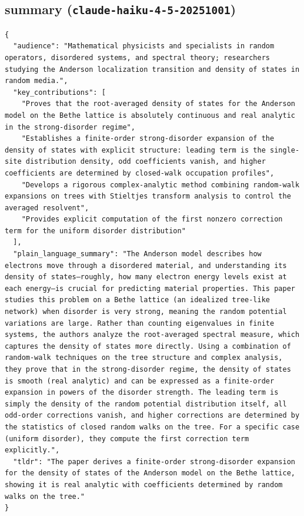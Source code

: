 \documentclass[11pt]{article}
\begin{document}
\subsection*{summary (\texttt{claude-haiku-4-5-20251001})}
\begin{verbatim}
{
  "audience": "Mathematical physicists and specialists in random operators, disordered systems, and spectral theory; researchers studying the Anderson localization transition and density of states in random media.",
  "key_contributions": [
    "Proves that the root-averaged density of states for the Anderson model on the Bethe lattice is absolutely continuous and real analytic in the strong-disorder regime",
    "Establishes a finite-order strong-disorder expansion of the density of states with explicit structure: leading term is the single-site distribution density, odd coefficients vanish, and higher coefficients are determined by closed-walk occupation profiles",
    "Develops a rigorous complex-analytic method combining random-walk expansions on trees with Stieltjes transform analysis to control the averaged resolvent",
    "Provides explicit computation of the first nonzero correction term for the uniform disorder distribution"
  ],
  "plain_language_summary": "The Anderson model describes how electrons move through a disordered material, and understanding its density of states—roughly, how many electron energy levels exist at each energy—is crucial for predicting material properties. This paper studies this problem on a Bethe lattice (an idealized tree-like network) when disorder is very strong, meaning the random potential variations are large. Rather than counting eigenvalues in finite systems, the authors analyze the root-averaged spectral measure, which captures the density of states more directly. Using a combination of random-walk techniques on the tree structure and complex analysis, they prove that in the strong-disorder regime, the density of states is smooth (real analytic) and can be expressed as a finite-order expansion in powers of the disorder strength. The leading term is simply the density of the random potential distribution itself, all odd-order corrections vanish, and higher corrections are determined by the statistics of closed random walks on the tree. For a specific case (uniform disorder), they compute the first correction term explicitly.",
  "tldr": "The paper derives a finite-order strong-disorder expansion for the density of states of the Anderson model on the Bethe lattice, showing it is real analytic with coefficients determined by random walks on the tree."
}
\end{verbatim}
\end{document}

